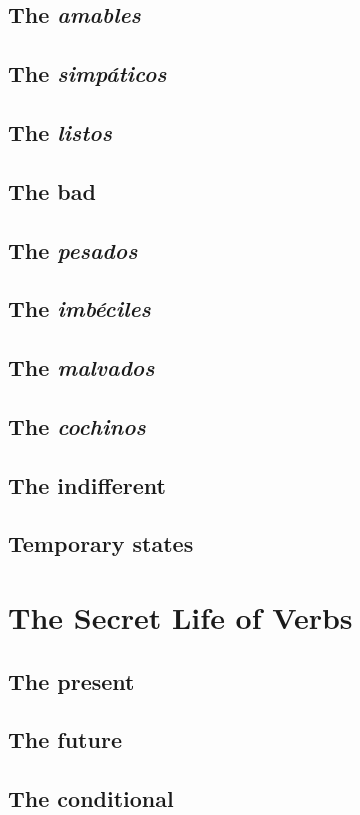 \section{The \textit{amables}}
\section{The \textit{simpáticos}}
\section{The \textit{listos}}
\section{The bad}
\section{The \textit{pesados}}
\section{The \textit{imbéciles}}
\section{The \textit{malvados}}
\section{The \textit{cochinos}}
\section{The indifferent}
\section{Temporary states}

\chapter{The Secret Life of Verbs}

\section{The present}
\section{The future}
\section{The conditional}

